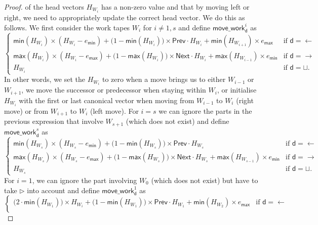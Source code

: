 \begin{proof}
    of the head vectors $H_{W_i}$ has a non-zero value and that by moving left or right, we need to 
    appropriately update the correct head vector. We do this as follows. We first consider the work tapes 
    $W_i$ for $i\neq 1,s$ and define $    \mathsf{move\_work}^i_{\mathsf{d}}$ as
    $$
    \begin{cases}
        \mathsf{min}(H_{W_i})\times (H_{W_i}-e_{\mathsf{min}}) + \bigl(1-\mathsf{min}(H_{W_i})\bigr)\times \mathsf{Prev}\cdot H_{W_i} 
		+ \mathsf{min}(H_{W_{i+1}})\times e_{\mathsf{max}} & \text{if $\mathsf{d}=\leftarrow$}\\
            \mathsf{max}(H_{W_i})\times (H_{W_i}-e_{\mathsf{max}}) + \bigl(1-\mathsf{max}(H_{W_i})\bigr)\times \mathsf{Next}\cdot H_{W_i}
			+ \mathsf{max}(H_{W_{i-1}})\times e_{\mathsf{min}} & \text{if $\mathsf{d}=\rightarrow$}\\
        H_{W_i} & \text{if $\mathsf{d}=\sqcup$}. 	
    \end{cases}
    $$
    In other words, we set the $H_{W_i}$ to zero when a move brings us to either $W_{i-1}$ or $W_{i+1}$, we
    move the successor or predecessor when staying within $W_i$, or initialise $H_{W_i}$ with the first or 
    last canonical vector when moving from $W_{i-1}$ to $W_i$ (right move) or from $W_{i+1}$ to $W_i$ (left move).
    For $i=s$ we can ignore the parts in the previous expression that involve $W_{s+1}$ (which does not exist)
	and define $\mathsf{move\_work}^s_{\mathsf{d}}$ as
    $$
     \begin{cases}
        \mathsf{min}(H_{W_s})\times (H_{W_s}-e_{\mathsf{min}}) + \bigl(1-\mathsf{min}(H_{W_s})\bigr)\times \mathsf{Prev}\cdot H_{W_s} & \text{if $\mathsf{d}=\leftarrow$}\\
            \mathsf{max}(H_{W_s}) \times (H_{W_s}-e_{\mathsf{max}})  + \bigl(1-\mathsf{max}(H_{W_s})\bigr)\times \mathsf{Next}\cdot H_{W_s}
		+ \mathsf{max}(H_{W_{s-1}})\times e_{\mathsf{min}} & \text{if $\mathsf{d}=\rightarrow$}\\
        H_{W_s} & \text{if $\mathsf{d}=\sqcup$}. 	
    \end{cases}
    $$
    For $i=1$, we can ignore the part involving $W_{0}$ (which does not exist) but have to take $\rhd$ 
    into account and define $  \mathsf{move\_work}^1_{\mathsf{d}}$ as
    $$
      \begin{cases}
        \bigl(2\cdot \mathsf{min}(H_{W_1})\bigr)\times H_{W_i} + \bigl(1-\mathsf{min}(H_{W_1})\bigr)\times \mathsf{Prev}\cdot H_{W_1} + \mathsf{min}(H_{W_{2}})\times e_{\mathsf{max}} & \text{if $\mathsf{d}=\leftarrow$}\\

\end{cases}$$
\end{proof}
